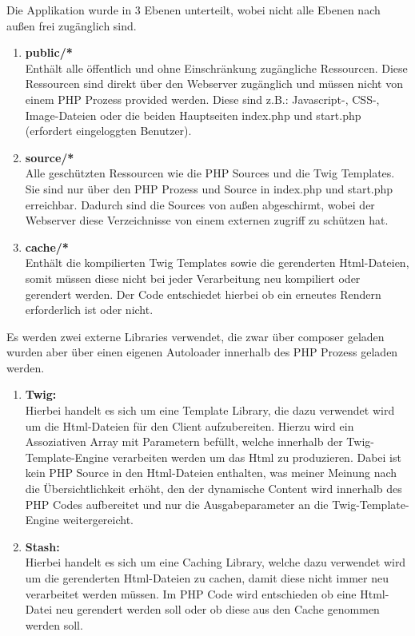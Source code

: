\documentclass[11pt, a4paper, twoside]{article}   	%
\begin{document}
\newpage 
Die Applikation wurde in 3 Ebenen unterteilt, wobei nicht alle Ebenen nach außen frei zugänglich sind.\\
\begin{enumerate}
	\item \textbf{public/*} \\
	Enthält alle öffentlich und ohne Einschränkung zugängliche Ressourcen. Diese Ressourcen sind direkt über den Webserver zugänglich und müssen nicht von einem PHP Prozess provided werden. Diese sind z.B.: Javascript-, CSS-, Image-Dateien oder die beiden Hauptseiten index.php und start.php (erfordert eingeloggten Benutzer). 
	\item \textbf{source/*} \\
	Alle geschützten Ressourcen wie die PHP Sources und die Twig Templates. Sie sind nur über den PHP Prozess und Source in index.php und start.php erreichbar. Dadurch sind die Sources von außen abgeschirmt, wobei der Webserver diese Verzeichnisse von einem externen zugriff zu schützen hat.
	\item \textbf{cache/*}\\
	Enthält die kompilierten Twig Templates sowie die gerenderten Html-Dateien, somit müssen diese nicht bei jeder Verarbeitung neu kompiliert oder gerendert werden. Der Code entschiedet hierbei ob ein erneutes Rendern erforderlich ist oder nicht.
\end{enumerate}
Es werden zwei externe Libraries verwendet, die zwar über composer geladen wurden aber über einen eigenen Autoloader innerhalb des PHP Prozess geladen werden.
\begin{enumerate}
	\item \textbf{Twig:}\\
	Hierbei handelt es sich um eine Template Library, die dazu verwendet wird um die Html-Dateien für den Client aufzubereiten. Hierzu wird ein Assoziativen Array mit Parametern befüllt, welche innerhalb der Twig-Template-Engine verarbeiten werden um das Html zu produzieren. Dabei ist kein PHP Source in den Html-Dateien enthalten, was meiner Meinung nach die Übersichtlichkeit erhöht, den der dynamische Content wird innerhalb des PHP Codes aufbereitet und nur die Ausgabeparameter an die Twig-Template-Engine weitergereicht.
	\item \textbf{Stash:}\\
	Hierbei handelt es sich um eine Caching Library, welche dazu verwendet wird um die gerenderten Html-Dateien zu cachen, damit diese nicht immer neu verarbeitet werden müssen. Im PHP Code wird entschieden ob eine Html-Datei neu gerendert werden soll oder ob diese aus den Cache genommen werden soll.
\end{enumerate}
\newpage
\end{document}
